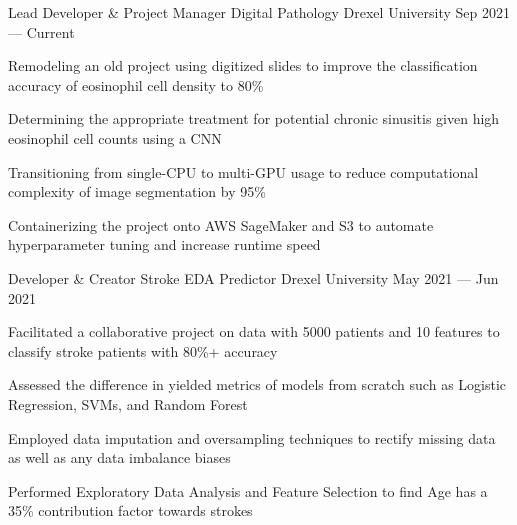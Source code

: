 
\begin{cventries}
  \cventry
    {Lead Developer \& Project Manager} %
    {Digital Pathology} %
    {Drexel University} %
    {Sep 2021 --- Current} %
    {
      \begin{cvitems} %
        \item{Remodeling an old project using digitized slides to improve the classification accuracy of eosinophil cell density to 80\%}
        \item{Determining the appropriate treatment for potential chronic sinusitis given high eosinophil cell counts using a CNN}
        \item{Transitioning from single-CPU to multi-GPU usage to reduce computational complexity of image segmentation by 95\%}
        \item{Containerizing the project onto AWS SageMaker and S3 to automate hyperparameter tuning and increase runtime speed}
      \end{cvitems}
    }
    
    \cventry
    {Developer \& Creator} %
    {Stroke EDA Predictor} %
    {Drexel University} %
    {May 2021 --- Jun 2021} %
    {
      \begin{cvitems} %
        \item{Facilitated a collaborative project on data with 5000 patients and 10 features to classify stroke patients with 80\%+ accuracy}
        \item{Assessed the difference in yielded metrics of models from scratch such as Logistic Regression, SVMs, and Random Forest}
        \item{Employed data imputation and oversampling techniques to rectify missing data as well as any data imbalance biases}
		\item{Performed Exploratory Data Analysis and Feature Selection to find Age has a 35\% contribution factor towards strokes}
      \end{cvitems}
    }
\end{cventries}
